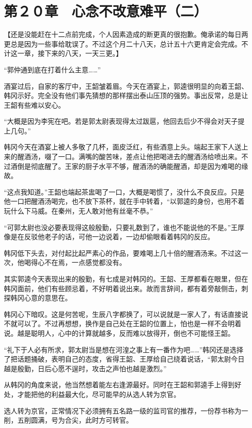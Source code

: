 \section{第２０章　心念不改意难平（二）}

【还是没能赶在十二点前完成，个人因素造成的断更真的很抱歉。俺承诺的每日两更总是因为一些事给耽误了。不过这个月二十八天，总计五十六更肯定会完成。不计这一章，接下来的八天，一天三更。】

“郭仲通到底在打着什么主意……”

酒宴过后，自家的客厅中，王韶皱着眉。今天在酒宴上，郭逵很明显的向着王韶、韩冈示好。完全没有他们事先猜想的那样摆出泰山压顶的强势。事出反常，总是让王韶有些难以安心。

“大概是因为李宪在吧。若是郭太尉表现得太过跋扈，他回去后少不得会对天子提上几句。”

韩冈今天在酒宴上被人多敬了几杯，面皮泛红，有些酒意上头。端起王家下人送上来的醒酒汤，啜了一口。满嘴的酸苦味，差点让他把喝进去的醒酒汤给喷出来。不过酒倒是彻底醒了。王家的厨子水平不够，醒酒汤的确能醒酒，却是因为难喝的缘故。

“这点我知道。”王韶也端起茶盅喝了一口，大概是喝惯了，没什么不良反应。只是他一口把醒酒汤喝完，也不放下茶杯，就在手中转着，“以郭逵的身份，也用不着玩什么下马威。在秦州，无人敢对他有丝毫不恭。”

“可郭太尉也没必要表现得这般殷勤，只要礼数到了，谁也不能说他的不是。”王厚像是在反驳他老子的话，可他一边说着，一边却偷眼看着韩冈的反应。

韩冈低下头去，对付起比起严素心的作品，要难喝上几十倍的醒酒汤来。不过这一次，他喝得心不在焉，一点感觉都没有。

其实郭逵今天表现出来的殷勤，有七成是对韩冈的。王韶、王厚都看在眼里，但在韩冈面前，他们有些顾忌着，不好明着说出来。故而言辞间，都有着旁敲侧击，刺探韩冈心意的意思在。

韩冈心下暗叹。这是何苦呢，生辰八字都换了，可以说就是一家人了，有话直接说不就可以了。不过再想想，换作是自己处在王韶的位置上，怕也是一样不会明着说。越是聪明人，心中的计算就越多，反而难以放得开，倒也不可能怪王韶。

“礼下于人必有所求，郭太尉当是想在河湟之事上有一番作为吧……”韩冈还是选择了把话题捅破，表明自己的态度，省得王韶、王厚给自己绕着说话，“郭太尉今日越是殷勤，日后心愿不逞时，攻击之声怕也越是激烈。”

从韩冈的角度来说，他当然想着能左右逢源最好。同时在王韶和郭逵手上得到好处，才能把他的利益最大化，尽可能早的从选人转为京官。

选人转为京官，正常情况下必须拥有五名路一级的监司官的推荐，一份荐书称为一削，五削圆满，号为合尖，此时方可转官。

